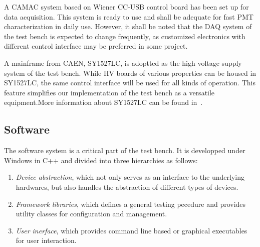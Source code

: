\documentclass[5p, times]{elsarticle}
\begin{document}

A CAMAC system based on Wiener CC-USB control board has been set up for data acquisition.
This system is ready to use and shall be adequate for fast PMT characterization in daily use.
However, it shall be noted that the DAQ system of the test bench is expected to change frequently, as customized electronics with different control interface may be preferred in some project.

A mainframe from CAEN, SY1527LC, is adoptted as the high voltage supply system of the test bench.
While HV boards of various properties can be housed in SY1527LC, the same control interface will be used for all kinds of operation.
This feature simplifies our implementation of the test bench as a versatile equipment.More information about SY1527LC can be found in~\cite{sy1527lc}.

\subsection{Software}
\label{sec:software}

The software system is a critical part of the test bench.
It is developped under Windows in C++ and divided into three hierarchies as follows:
\begin{enumerate}
 \item \textit{Device abstraction}, which not only serves as an interface to the underlying hardwares, but also handles the abstraction of different types of devices. 
 \item \textit{Framework libraries}, which defines a general testing pecedure and provides utility classes for configuration and management.
 \item \textit{User inerface}, which provides command line based or graphical executables for user interaction. 
\end{enumerate}
\end{document}
